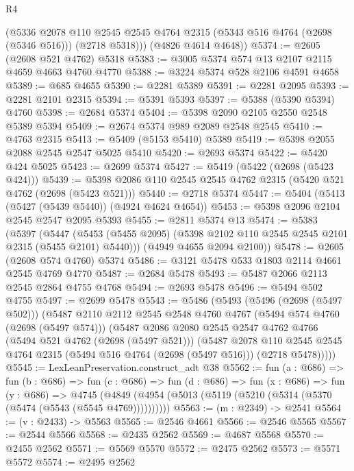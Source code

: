 \begin{lexlean}{R4}
\begin{coremodule}
        (@5336
          @2078
          @110
          @2545
          @2545
          @4764
          @2315
          (@5343 @516 @4764 (@2698 (@5346 @516)))
          (@2718 @5318)))
      (@4826 @4614 @4648))
@5374 := @2605 (@2608 @521 @4762) @5318
@5383 := @3005 @5374 @574 @13 @2107 @2115 @4659 @4663 @4760 @4770
@5388 := @3224 @5374 @528 @2106 @4591 @4658
@5389 := @685 @4655
@5390 := @2281 @5389
@5391 := @2281 @2095
@5393 := @2281 @2101 @2315
@5394 := @5391 @5393
@5397 := @5388 (@5390 @5394) @4760
@5398 := @2684 @5374
@5404 := @5398 @2090 @2105 @2550 @2548 @5389 @5394
@5409 := @2674 @5374 @989 @2089 @2548 @2545
@5410 := @4763 @2315
@5413 := @5409 (@5153 @5410) @5389
@5419 := @5398 @2055 @2088 @2545 @2547 @5025 @5410
@5420 := @2693 @5374
@5422 := @5420 @424 @5025
@5423 := @2699 @5374
@5427 := @5419 (@5422 (@2698 (@5423 @424)))
@5439 := @5398 @2086 @110 @2545 @2545 @4762 @2315 (@5420 @521 @4762 (@2698 (@5423 @521)))
@5440 := @2718 @5374
@5447 := @5404 (@5413 (@5427 (@5439 @5440)) (@4924 @4624 @4654))
@5453 := @5398 @2096 @2104 @2545 @2547 @2095 @5393
@5455 := @2811 @5374 @13
@5474 := @5383
    (@5397
      (@5447 (@5453 (@5455 @2095) (@5398 @2102 @110 @2545 @2545 @2101 @2315 (@5455 @2101) @5440)))
      (@4949 @4655 @2094 @2100))
@5478 := @2605 (@2608 @574 @4760) @5374
@5486 := @3121 @5478 @533 @1803 @2114 @4661 @2545 @4769 @4770
@5487 := @2684 @5478
@5493 := @5487 @2066 @2113 @2545 @2864 @4755 @4768
@5494 := @2693 @5478
@5496 := @5494 @502 @4755
@5497 := @2699 @5478
@5543 := @5486
    (@5493
      (@5496 (@2698 (@5497 @502)))
      (@5487
        @2110
        @2112
        @2545
        @2548
        @4760
        @4767
        (@5494 @574 @4760 (@2698 (@5497 @574)))
        (@5487
          @2086
          @2080
          @2545
          @2547
          @4762
          @4766
          (@5494 @521 @4762 (@2698 (@5497 @521)))
          (@5487
            @2078
            @110
            @2545
            @2545
            @4764
            @2315
            (@5494 @516 @4764 (@2698 (@5497 @516)))
            (@2718 @5478)))))
@5545 := LexLeanPreservation.construct_adt @38
@5562 := fun (a : @686) =>
  fun (b : @686) =>
  fun (c : @686) =>
  fun (d : @686) =>
  fun (x : @686) =>
  fun (y : @686) =>
  @4745 (@4849 (@4954 (@5013 (@5119 (@5210 (@5314 (@5370 (@5474 (@5543 (@5545 @4769))))))))))
@5563 := (m : @2349) -> @2541
@5564 := (v : @2433) -> @5563
@5565 := @2546 @4661
@5566 := @2546 @5565
@5567 := @2544 @5566
@5568 := @2435 @2562
@5569 := @4687 @5568
@5570 := @2455 @2562
@5571 := @5569 @5570
@5572 := @2475 @2562
@5573 := @5571 @5572
@5574 := @2495 @2562

\end{coremodule}
\end{lexlean}
